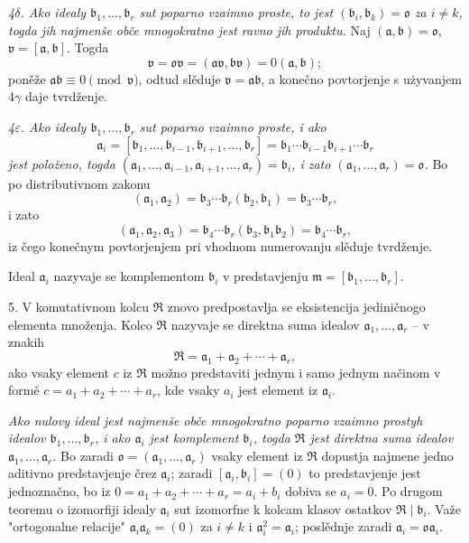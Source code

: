 \documentclass[11pt]{article}
\providecommand{\mR}{\mathfrak{R}}
\providecommand{\ma}{\mathfrak{a}}
\providecommand{\mb}{\mathfrak{b}}
\providecommand{\mm}{\mathfrak{m}}
\providecommand{\mo}{\mathfrak{o}}
\providecommand{\mv}{\mathfrak{v}}
\begin{document}
\emph{4$\delta$. Ako idealy $\mb_1,\ldots,\mb_r$ sut poparno vzaimno proste, to jest $(\mb_i,\mb_k)=\mo$ za $i\ne k$, togda jih najmenše obče mnogokratno jest ravno jih produktu.} Naj $(\ma,\mb)=\mo$, $\mv=[\ma,\mb]$. Togda
\[
\mv=\mo\mv=(\ma\mv,\mb\mv)=0(\ma,\mb);
\]
poněže $\ma\mb\equiv0\pmod{\mv}$, odtud slěduje $\mv=\ma\mb$, a konečno povtorjenje s użyvanjem 4$\gamma$ daje tvrdženje.

\emph{4$\varepsilon$. Ako idealy $\mb_1,\ldots,\mb_r$ sut poparno vzaimno proste, i ako}
\[
\ma_i=[\mb_1,\ldots,\mb_{i-1},\mb_{i+1},\ldots,\mb_r]
=\mb_1\cdots\mb_{i-1}\mb_{i+1}\cdots\mb_r
\]
\emph{jest položeno, togda $(\ma_1,\ldots,\ma_{i-1},\ma_{i+1},\ldots,\ma_r)=\mb_i$, i zato $(\ma_1,\ldots,\ma_r)=\mo$.} Bo po distributivnom zakonu
\[
(\ma_1,\ma_2)=\mb_3\cdots\mb_r(\mb_2,\mb_1)=\mb_3\cdots\mb_r,
\]
i zato
\[
(\ma_1,\ma_2,\ma_3)=\mb_4\cdots\mb_r(\mb_3,\mb_1\mb_2)=\mb_4\cdots\mb_r,
\]
iz čego konečnym povtorjenjem pri vhodnom numerovanju slěduje tvrdženje.

Ideal $\ma_i$ nazyvaje se komplementom $\mb_i$ v predstavjenju $\mm=[\mb_1,\ldots,\mb_r]$.

5. V komutativnom kolcu $\mR$ znovo predpostavlja se eksistencija jediničnogo elementa množenja. Kolco $\mR$ nazyvaje se direktna suma idealov $\ma_1,\ldots,\ma_r$ -- v znakih
\[
\mR=\ma_1+\ma_2+\cdots+\ma_r,
\]
ako vsaky element $c$ iz $\mR$ možno predstaviti jednym i samo jednym načinom v formě $c=a_1+a_2+\cdots+a_r$, kde vsaky $a_i$ jest element iz $\ma_i$.

\emph{Ako nulovy ideal jest najmenše obče mnogokratno poparno vzaimno prostyh idealov $\mb_1,\ldots,\mb_r$, i ako $\ma_i$ jest komplement $\mb_i$, togda $\mR$ jest direktna suma idealov $\ma_1,\ldots,\ma_r$.} Bo zaradi $\mo=(\ma_1,\ldots,\ma_r)$ vsaky element iz $\mR$ dopustja najmene jedno aditivno predstavjenje črez $\ma_i$; zaradi $[\ma_i,\mb_i]=(0)$ to predstavjenje jest jednoznačno, bo iz $0=a_1+a_2+\cdots+a_r=a_i+b_i$ dobiva se $a_i=0$. Po drugom teoremu o izomorfiji idealy $\ma_i$ sut izomorfne k kolcam klasov ostatkov $\mR\mid\mb_i$. Važe "ortogonalne relacije" $\ma_i\ma_k=(0)$ za $i\ne k$ i $\ma_i^2=\ma_i$; poslědnje zaradi $\ma_i=\mo\ma_i$.
\end{document}
